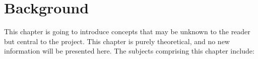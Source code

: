 


\chapter{Background}
This chapter is going to introduce concepts that may be unknown to the reader but central to the project. This chapter is purely theoretical, and no new information will be presented here. The subjects comprising this chapter include:
